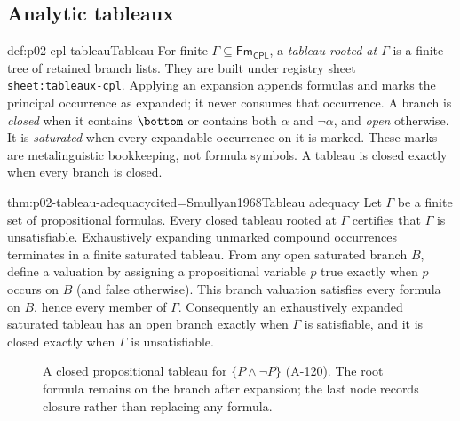 \subsection{Analytic tableaux}
\label{sec:p02-analytic-tableaux}

\begin{hbdefinition}{def:p02-cpl-tableau}{Tableau}
For finite \(\Gamma\subseteq\mathsf{Fm}_{\mathsf{CPL}}\), a
\emph{tableau rooted at \(\Gamma\)} is a finite tree of retained branch
lists.  They are built under registry sheet
\hyperref[sheet:tableaux-cpl]{\texttt{sheet:tableaux-cpl}}.  Applying an
expansion appends formulas and marks the principal occurrence as expanded;
it never consumes that occurrence.  A branch is \emph{closed} when it
contains \(\bottom\) or contains both \(\alpha\) and \(\neg\alpha\), and
\emph{open} otherwise.  It is \emph{saturated} when every expandable
occurrence on it is marked.  These marks are metalinguistic bookkeeping, not
formula symbols.  A tableau is closed exactly when every branch is closed.
\end{hbdefinition}

\begin{hbtheorem}{thm:p02-tableau-adequacy}{cited=Smullyan1968}{Tableau adequacy}
Let \(\Gamma\) be a finite set of propositional formulas.  Every closed
tableau rooted at \(\Gamma\) certifies that \(\Gamma\) is unsatisfiable.
Exhaustively expanding unmarked compound occurrences terminates in a finite
saturated tableau.  From any open saturated branch \(B\), define a valuation
by assigning a propositional variable \(p\) true exactly when \(p\) occurs
on \(B\) (and false otherwise).  This branch valuation satisfies every
formula on \(B\), hence every member of \(\Gamma\).  Consequently an
exhaustively expanded saturated tableau has an open branch
exactly when \(\Gamma\) is satisfiable, and it is closed exactly when
\(\Gamma\) is unsatisfiable.
\end{hbtheorem}

\begin{figure}[htbp]
\centering
{}
\caption{A closed propositional tableau for
\(\{P\land\neg P\}\) (A-120).  The root formula remains on the branch
after expansion; the last node records closure rather than replacing any
formula.}
\label{fig:p02-closed-tableau}
\end{figure}

